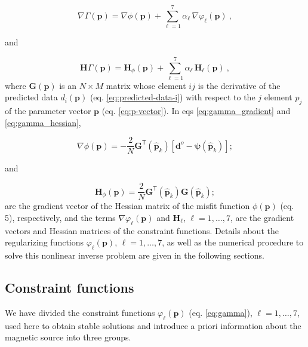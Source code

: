 \begin{equation}\label{eq:gamma_gradient}
\nabla\Gamma (\mathbf{p}) = \nabla\phi (\mathbf{p}) + \sum\limits^{7}_{\ell =1} \alpha_{\ell} \, \nabla\varphi_{\ell}(\mathbf{p}) \: ,
\end{equation}

and

\begin{equation}\label{eq:gamma_hessian}
\mathbf{H}\Gamma (\mathbf{p}) = \mathbf{H}_\phi (\mathbf{p}) + \sum\limits^{7}_{\ell =1} \alpha_{\ell} \, \mathbf{H}_\ell(\mathbf{p}) \: ,
\end{equation}
where $\mathbf{G}(\mathbf{p})$ is an $N \times M$ matrix whose element $ij$ is the derivative of the predicted data $d_{i}(\mathbf{p})$ (eq. \ref{eq:predicted-data-i}) with respect to the $j$ element $p_{j}$ of the parameter vector $\mathbf{p}$ (eq. \ref{eq:p-vector}). In eqs \ref{eq:gamma_gradient} and \ref{eq:gamma_hessian}, 

\begin{equation}\label{eq:phi_gradient}
\nabla \phi(\mathbf{p}) =  - \frac{2}{N}\mathbf{G}^{\mathsf{T}}(\hat{\mathbf{p}}_k)[\mathbf{d}^o - \boldsymbol{\psi}(\hat{\mathbf{p}}_k)];
\end{equation} 

and 

\begin{equation}\label{eq:phi_hessian}
\mathbf{H}_{\phi}(\mathbf{p}) = \frac{2}{N}\mathbf{G}^{\mathsf{T}}(\hat{\mathbf{p}}_k)\mathbf{G}(\hat{\mathbf{p}}_k);
\end{equation}
are the gradient vector of the Hessian matrix of the misfit function $\phi(\mathbf{p})$ (eq. 5), respectively, and the terms $\nabla \varphi_{\ell}(\mathbf{p})$ and $\mathbf{H}_{\ell}$, $\ell = 1, \dots, 7$, are the gradient vectors and Hessian matrices of the constraint functions. Details about the regularizing functions $\varphi_\ell(\mathbf{p})$, $\ell = 1, \dots, 7$, as well as the numerical procedure to solve this nonlinear inverse problem are given in the following sections.

\subsection{Constraint functions}\label{sec:constraints}

We have divided the constraint functions $\varphi_{\ell}(\mathbf{p})$ (eq. \ref{eq:gamma}), $\ell = 1, \dots, 7$, used here to 
obtain stable solutions and introduce a priori information about the magnetic source into three groups.



